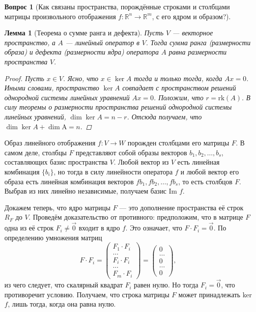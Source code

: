 \documentclass[a4paper,11pt]{article}
\newtheorem*{lemma}{Лемма}
\theoremstyle{remark}
\theoremstyle{definition}
\newtheorem{question}{Вопрос}
\numberwithin{question}{subsection}
\begin{document}
\begin{question}[Как связаны пространства, порождённые строками и столбцами матрицы произвольного отображения \(f: \mathbb{R}^n \rightarrow \mathbb{R}^m\), с его ядром и образом?]
\begin{lemma}[Теорема о сумме ранга и дефекта]
Пусть \(V\) --- векторное пространство, а \(A\) --- линейный оператор в \(V\). Тогда сумма ранга (размерности образа) и дефекта (размерности ядра) оператора \(A\) равна размерности пространства \(V\).

\begin{proof}
Пусть \(x \in V\). Ясно, что \(x \in \ker A\) тогда и только тогда, когда \(Ax = 0\). Иными словами, пространство \(\ker A\) совпадает с пространством решений однородной системы линейных уравнений \(Ax = 0\). Положим, что \(r = \mathrm{rk}(A)\). В силу теоремы о размерности пространства решений однородной системы линейных уравнений, \(\dim \ker A = n - r\). Отсюда получаем, что \(\dim \ker A + \dim \mathrm{A} = n\).
\end{proof}
\end{lemma}


Образ линейного отображения \(f: V \rightarrow W\) порожден столбцами его матрицы \(F\). В самом деле, столбцы \(F\) представляют собой образы векторов \(b_1, b_2, \dots, b_s\), составляющих базис пространства \(V\). Любой вектор из \(V\) есть линейная комбинация \(\{b_i\}\), но тогда в силу линейности оператора \(f\) и любой вектор его образа есть линейная комбинация векторов \(fb_1, fb_2, \dots, fb_s\), то есть столбцов \(F\). Выбрав из них линейно независимые, получаем базис Im \(f\).

Докажем теперь, что ядро матрицы \(F\) --- это дополнение пространства её строк \(R_F\) до \(V\). Проведём доказательство от противного: предположим, что в матрице \(F\) одна из её строк \(F_i \neq \vec{0}\) входит в ядро \(f\). Это означает, что \(F \cdot F_i = \vec{0}\). По определению умножения матриц
\begin{equation*}
	F \cdot F_i =
	\begin{pmatrix}
		F_1 \cdot F_i \\
		\dots \\
		F_i \cdot F_i \\
		\dots \\
		F_m \cdot F_i
	\end{pmatrix} = 
	\begin{pmatrix}
		0 \\
		\dots \\
		0 \\
		\dots \\
		0
	\end{pmatrix},
\end{equation*}
из чего следует, что скалярный квадрат \(F_i\) равен нулю. Но тогда \(F_i = \vec{0}\), что противоречит условию. Получаем, что строка матрицы \(F\) может принадлежать ker \(f\), лишь тогда, когда она равна нулю.


\end{question}
\end{document}
